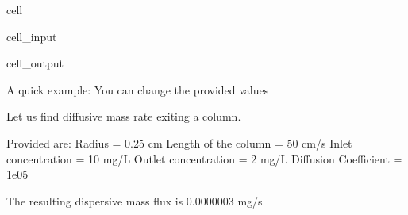 \documentclass[letterpaper,10pt,english]{jupyterBook}
\begin{document}
\begin{sphinxuseclass}{cell}
\begin{sphinxVerbatimInput}
\begin{sphinxuseclass}{cell_input}
\begin{sphinxVerbatim}[commandchars=\\\{\}]
\end{sphinxVerbatim}

\end{sphinxuseclass}\end{sphinxVerbatimInput}
\begin{sphinxVerbatimOutput}

\begin{sphinxuseclass}{cell_output}
\begin{sphinxVerbatim}[commandchars=\\\{\}]
A quick example: You can change the provided values

Let us find diffusive mass rate exiting a column.

Provided are:
Radius = 0.25 cm
Length of the column = 50 cm/s
Inlet concentration = 10 mg/L
Outlet concentration = 2 mg/L 
Diffusion Coefficient = 1e\PYGZhy{}05 

The resulting dispersive mass flux is 0.0000003 mg/s
\end{sphinxVerbatim}

\end{sphinxuseclass}\end{sphinxVerbatimOutput}

\end{sphinxuseclass}
\end{document}
